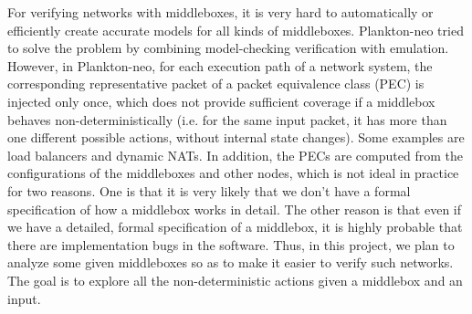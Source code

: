For verifying networks with middleboxes, it is very hard to automatically or
efficiently create accurate models for all kinds of middleboxes. Plankton-neo
\cite{2018-PrabhuEtAl} tried to solve the problem by combining model-checking
verification with emulation. However, in Plankton-neo, for each execution path
of a network system, the corresponding representative packet of a packet
equivalence class (PEC) is injected only once, which does not provide sufficient
coverage if a middlebox behaves non-deterministically (i.e. for the same input
packet, it has more than one different possible actions, without internal state
changes). Some examples are load balancers and dynamic NATs. In addition, the
PECs are computed from the configurations of the middleboxes and other nodes,
which is not ideal in practice for two reasons. One is that it is very likely
that we don't have a formal specification of how a middlebox works in detail.
The other reason is that even if we have a detailed, formal specification of a
middlebox, it is highly probable that there are implementation bugs in the
software.
Thus, in this project, we plan to analyze some given middleboxes so as to make 
it easier to verify such networks. The goal is to explore all the non-deterministic 
actions given a middlebox and an input.

